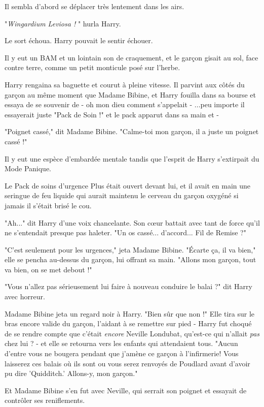 Il sembla d'abord se déplacer très lentement dans les airs.

"\emph{Wingardium Leviosa !} " hurla Harry.

Le sort échoua. Harry pouvait le sentir échouer.

Il y eut un BAM et un lointain son de craquement, et le garçon gisait au sol, face contre terre, comme un petit monticule posé sur l'herbe.

Harry rengaina sa baguette et courut à pleine vitesse. Il parvint aux côtés du garçon au même moment que Madame Bibine, et Harry fouilla dans sa bourse et essaya de se souvenir de - oh mon dieu comment s'appelait - ...peu importe il essayerait juste "Pack de Soin !" et le pack apparut dans sa main et -

"Poignet cassé," dit Madame Bibine. "Calme-toi mon garçon, il a juste un poignet cassé !"

Il y eut une espèce d'embardée mentale tandis que l'esprit de Harry s'extirpait du Mode Panique.

Le Pack de soins d'urgence Plus était ouvert devant lui, et il avait en main une seringue de feu liquide qui aurait maintenu le cerveau du garçon oxygéné si jamais il s'était brisé le cou.

"Ah..." dit Harry d'une voix chancelante. Son cœur battait avec tant de force qu'il ne s'entendait presque pas haleter. "Un os cassé... d'accord... Fil de Remise ?"

"C'est seulement pour les urgences," jeta Madame Bibine. "Écarte ça, il va bien," elle se pencha au-dessus du garçon, lui offrant sa main. "Allons mon garçon, tout va bien, on se met debout !"

"Vous n'allez pas sérieusement lui faire à nouveau conduire le balai ?" dit Harry avec horreur.

Madame Bibine jeta un regard noir à Harry. "Bien sûr que non !" Elle tira sur le bras encore valide du garçon, l'aidant à se remettre sur pied - Harry fut choqué de se rendre compte que c'était \emph{encore } Neville Londubat, qu'est-ce qui n'allait \emph{pas}  chez lui ? - et elle se retourna vers les enfants qui attendaient tous. "Aucun d'entre vous ne bougera pendant que j'amène ce garçon à l'infirmerie! Vous laisserez ces balais où ils sont ou vous serez renvoyés de Poudlard avant d'avoir pu dire 'Quidditch.' Allons-y, mon garçon."

Et Madame Bibine s'en fut avec Neville, qui serrait son poignet et essayait de contrôler ses reniflements.

